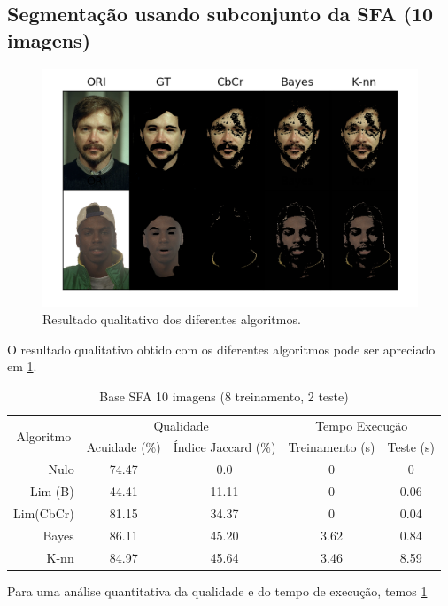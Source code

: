 \documentclass[conference]{IEEEtran}
\begin{document}
\subsection{Segmentação usando subconjunto da SFA (10 imagens)}
\begin{figure}[ht!]
\label{sfa10}
\begin{center}
\includegraphics[width=\columnwidth]{sfa10.png}
\caption{Resultado qualitativo dos diferentes algoritmos.}
\end{center}
\end{figure}
O resultado qualitativo obtido com os diferentes algoritmos pode ser apreciado em \ref{sfa10}.



\begin{table}[]
\centering
\caption{Base SFA 10 imagens (8 treinamento, 2 teste)}
\label{table_sfa10}
\begin{tabular}{|r|c|c|c|c|}
\hline
\multicolumn{1}{|c|}{\multirow{2}{*}{Algoritmo}} & \multicolumn{2}{c|}{Qualidade} & \multicolumn{2}{c|}{Tempo Execução} \\ \cline{2-5} 
\multicolumn{1}{|c|}{} & Acuidade (\%) & Índice Jaccard (\%) & Treinamento (s) & Teste (s) \\ \hline
Nulo & 74.47 & 0.0 & 0 & 0 \\ \hline
Lim (B) & 44.41 & 11.11 & 0 & 0.06 \\ \hline
Lim(CbCr) & 81.15 & 34.37 & 0 & 0.04 \\ \hline
Bayes & 86.11 & 45.20 & 3.62 & 0.84 \\ \hline
K-nn & 84.97 & 45.64 & 3.46 & 8.59 \\ \hline
\end{tabular}
\end{table}
Para uma análise quantitativa da qualidade e do tempo de execução, temos \ref{table_sfa10}
\end{document}
